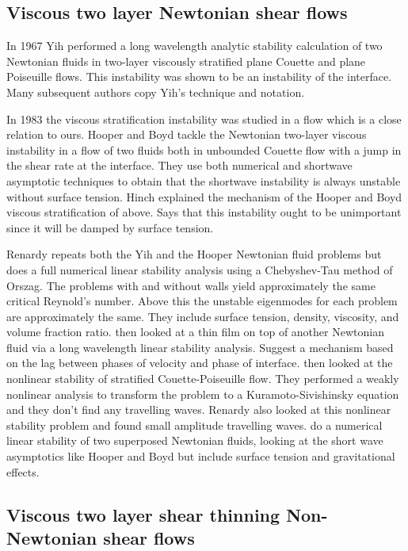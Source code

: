 \documentclass{jfm}
\begin{document}
\subsection{Viscous two layer Newtonian shear flows}

In 1967 Yih \citep{Yih1967} performed a long wavelength analytic stability
calculation of two Newtonian fluids in two-layer viscously stratified plane
Couette and plane Poiseuille flows. This instability was shown to be an
instability of the interface. Many subsequent authors copy Yih's technique and
notation.

In 1983 the viscous stratification instability was studied in a flow which is a
close relation to ours. Hooper and Boyd tackle the Newtonian two-layer viscous
instability \citep{Hooper1983} in a flow of two fluids both in unbounded
Couette flow with a jump in the shear rate at the interface. They use both
numerical and shortwave asymptotic techniques to obtain that the shortwave
instability is always unstable without surface tension. Hinch \citep{Hinch1984}
explained the mechanism of the Hooper and Boyd viscous stratification of above.
Says that this instability ought to be unimportant since it will be damped by
surface tension.

Renardy \citep{Renardy1985} repeats both the Yih and the Hooper Newtonian fluid
problems but does a full numerical linear stability analysis using a
Chebyshev-Tau method of Orszag. The problems with and without walls yield
approximately the same critical Reynold's number. Above this the unstable
eigenmodes for each problem are approximately the same. They include surface
tension, density, viscosity, and volume fraction ratio.  \citet{Hooper1985}
then looked at a thin film on top of another Newtonian fluid via a long
wavelength linear stability analysis. Suggest a mechanism based on the lag
between phases of velocity and phase of interface.  \citet{Hooper1985} then
looked at the nonlinear stability of stratified Couette-Poiseuille flow. They
performed a weakly nonlinear analysis to transform the problem to a
Kuramoto-Sivishinsky equation and they don't find any travelling waves. Renardy
\citep{Renardy1989} also looked at this nonlinear stability problem and found
small amplitude travelling waves.  \citet{Yiantsios1988} do a numerical linear
stability of two superposed Newtonian fluids, looking at the short wave
asymptotics like Hooper and Boyd but include surface tension and gravitational
effects.

\subsection{Viscous two layer shear thinning Non-Newtonian shear flows}
\end{document}

